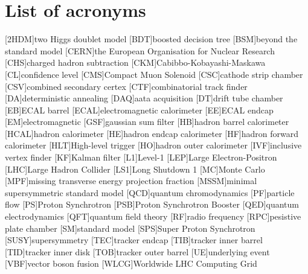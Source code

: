 




\chapter*{List of acronyms}
\begin{acronym}
[2HDM]{two Higgs doublet model}
[BDT]{boosted decision tree}
[BSM]{beyond the standard model}
[CERN]{the European Organisation for Nuclear Research }
[CHS]{charged hadron subtraction}
[CKM]{Cabibbo-Kobayashi-Maskawa}
[CL]{confidence level}
[CMS]{Compact Muon Solenoid}
[CSC]{cathode strip chamber}
[CSV]{combined secondary certex}
[CTF]{combinatorial track finder}
[DA]{deterministic annealing}
[DAQ]{aata acquisition}
[DT]{drift tube chamber}
[EB]{ECAL barrel}
[ECAL]{electromagnetic calorimeter}
[EE]{ECAL endcap}
[EM]{electromagnetic}
[GSF]{gaussian sum filter}
[HB]{hadron barrel calorimeter}
[HCAL]{hadron calorimeter}
[HE]{hadron endcap calorimeter}
[HF]{hadron forward calorimeter}
[HLT]{High-level trigger}
[HO]{hadron outer calorimeter}
[IVF]{inclusive vertex finder}
[KF]{Kalman filter}
[L1]{Level-1}
[LEP]{Large Electron-Positron}
[LHC]{Large Hadron Collider}
[LS1]{Long Shutdown 1}
[MC]{Monte Carlo}
[MPF]{missing transverse energy projection fraction}
[MSSM]{minimal supersymmetric standard model}
[QCD]{quantum chromodynamics}
[PF]{particle flow}
[PS]{Proton Synchrotron}
[PSB]{Proton Synchrotron Booster}
[QED]{quantum electrodynamics}
[QFT]{quantum field theory}
[RF]{radio frequency}
[RPC]{pesistive plate chamber}
[SM]{standard model}
[SPS]{Super Proton Synchrotron}
[SUSY]{supersymmetry}
[TEC]{tracker endcap}
[TIB]{tracker inner barrel}
[TID]{tracker inner disk}
[TOB]{tracker outer barrel}
[UE]{underlying event}
[VBF]{vector boson fusion}
[WLCG]{Worldwide LHC Computing Grid}
\end{acronym}

